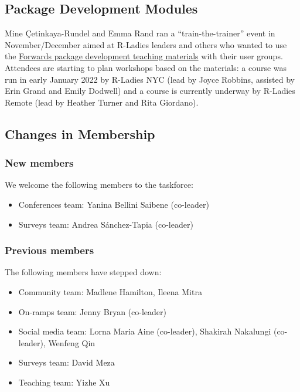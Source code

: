 \hypertarget{package-development-modules}{%
\subsection{Package Development Modules}\label{package-development-modules}}

Mine Çetinkaya-Rundel and Emma Rand ran a ``train-the-trainer'' event in November/December aimed at R-Ladies leaders and others who wanted to use the \href{https://github.com/forwards/workshops/tree/master/package-dev-modules}{Forwards package development teaching materials} with their user groups. Attendees are starting to plan workshops based on the materials: a course was run in early January 2022 by R-Ladies NYC (lead by Joyce Robbins, assisted by Erin Grand and Emily Dodwell) and a course is currently underway by R-Ladies Remote (lead by Heather Turner and Rita Giordano).

\hypertarget{changes-in-membership}{%
\subsection{Changes in Membership}\label{changes-in-membership}}

\hypertarget{new-members}{%
\subsubsection{New members}\label{new-members}}

We welcome the following members to the taskforce:

\begin{itemize}
\tightlist
\item
  Conferences team: Yanina Bellini Saibene (co-leader)
\item
  Surveys team: Andrea Sánchez-Tapia (co-leader)
\end{itemize}

\hypertarget{previous-members}{%
\subsubsection{Previous members}\label{previous-members}}

The following members have stepped down:

\begin{itemize}
\tightlist
\item
  Community team: Madlene Hamilton, Ileena Mitra
\item
  On-ramps team: Jenny Bryan (co-leader)
\item
  Social media team: Lorna Maria Aine (co-leader), Shakirah Nakalungi (co-leader), Wenfeng Qin
\item
  Surveys team: David Meza
\item
  Teaching team: Yizhe Xu
\end{itemize}

